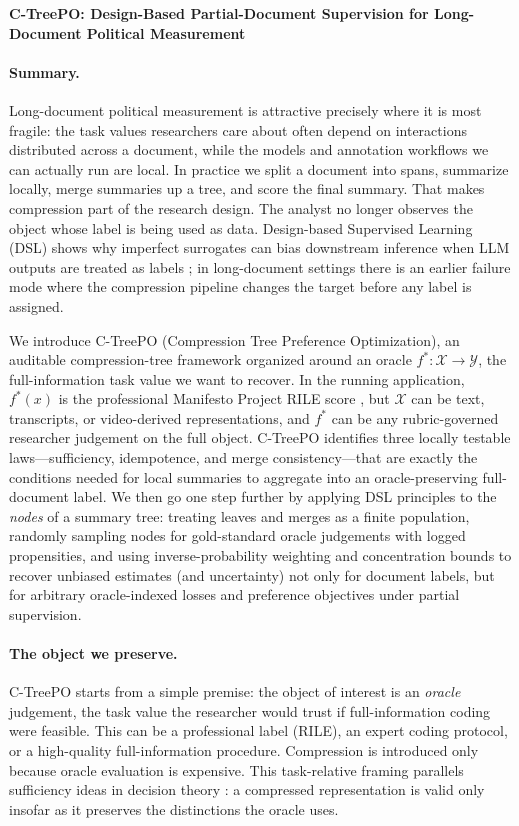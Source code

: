 \documentclass[11pt]{article}
\newcommand{\X}{\mathcal{X}}
\newcommand{\Y}{\mathcal{Y}}
\newcommand{\fstar}{f^\ast}
\begin{document}
\begin{center}
{\Large\bf C-TreePO: Design-Based Partial-Document Supervision for Long-Document Political Measurement}
\end{center}

\paragraph{Summary.}
Long-document political measurement is attractive precisely where it is most fragile: the task values researchers care about often depend on interactions distributed across a document, while the models and annotation workflows we can actually run are local. In practice we split a document into spans, summarize locally, merge summaries up a tree, and score the final summary. That makes compression part of the research design. The analyst no longer observes the object whose label is being used as data. Design-based Supervised Learning (DSL) shows why imperfect surrogates can bias downstream inference when LLM outputs are treated as labels \citep{EgamiEtAl2024}; in long-document settings there is an earlier failure mode where the compression pipeline changes the target before any label is assigned.

We introduce C-TreePO (Compression Tree Preference Optimization), an auditable compression-tree framework organized around an oracle $\fstar:\X\to\Y$, the full-information task value we want to recover. In the running application, $\fstar(x)$ is the professional Manifesto Project RILE score \citep{ManifestoProject2025a}, but $\X$ can be text, transcripts, or video-derived representations, and $\fstar$ can be any rubric-governed researcher judgement on the full object. C-TreePO identifies three locally testable laws---sufficiency, idempotence, and merge consistency---that are exactly the conditions needed for local summaries to aggregate into an oracle-preserving full-document label. We then go one step further by applying DSL principles to the \emph{nodes} of a summary tree: treating leaves and merges as a finite population, randomly sampling nodes for gold-standard oracle judgements with logged propensities, and using inverse-probability weighting and concentration bounds to recover unbiased estimates (and uncertainty) not only for document labels, but for arbitrary oracle-indexed losses and preference objectives under partial supervision.

\paragraph{The object we preserve.}
C-TreePO starts from a simple premise: the object of interest is an \emph{oracle} judgement, the task value the researcher would trust if full-information coding were feasible. This can be a professional label (RILE), an expert coding protocol, or a high-quality full-information procedure. Compression is introduced only because oracle evaluation is expensive. This task-relative framing parallels sufficiency ideas in decision theory \citep{Blackwell1953}: a compressed representation is valid only insofar as it preserves the distinctions the oracle uses.
\end{document}
